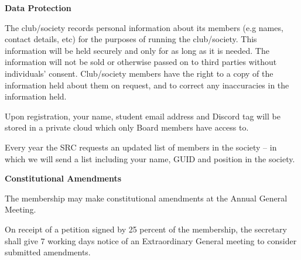 \documentclass[11pt]{article}
\newcommand{\headItem}[1]{\global\isHeadtrue\item {\bfseries #1}}
\newif\ifisHead
\begin{document}
\begin{level}
\begin{level}
\begin{level}
			\end{level}
			
		\end{level}
	
		\headItem {Data Protection}
		\begin{level}
			\item The club/society records personal information about its members (e.g names, contact details, etc) for the purposes of running the club/society. This information will be held securely and only for as long as it is needed. The information will not be sold or otherwise passed on to third parties without individuals’ consent. Club/society members have the right to a copy of the information held about them on request, and to correct any inaccuracies in the information held.
			\item Upon registration, your name, student email address and Discord tag will be stored in a private cloud which only Board members have access to.
			\item Every year the SRC requests an updated list of members in the society – in which we will send a list including your name, GUID and position in the society.
			
		\end{level}
	
		\headItem {Constitutional Amendments}
		\begin{level}
			\item The membership may make constitutional amendments at the Annual General Meeting.
			\item On receipt of a petition signed by 25 percent of the membership, the secretary shall give 7 working days notice of an Extraordinary General meeting to consider submitted amendments.
			
			
		\end{level}
	
	\end{level}
	
	
	
	
\end{document}
